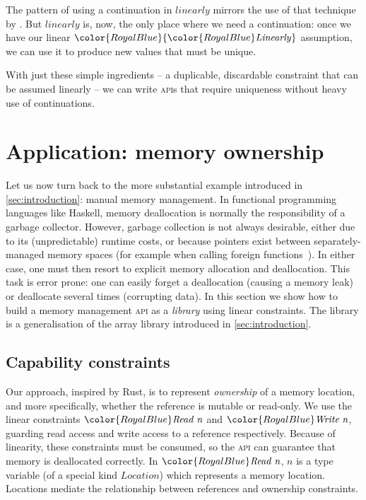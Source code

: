 \documentclass[acmsmall,usenames,dvipsnames,natbib=false,acmthm=false,screen]{acmart}
\newcommand{\Conid}[1]{\mathit{#1}}
\newcommand{\Varid}[1]{\mathit{#1}}
\newcommand{\constraintcolour}{\color{RoyalBlue}}
\newcommand{\constraintfont}[1]{{\constraintcolour#1}}
\theoremstyle{acmplain}
\theoremstyle{acmdefinition}
\begin{document}
The pattern of using a continuation in \ensuremath{\Varid{linearly}} mirrors the use
of that technique by \citet[Fig.~2]{LinearHaskell}. But
\ensuremath{\Varid{linearly}} is, now, the only place where we need a continuation: once
we have our linear \ensuremath{\constraintfont{\constraintfont{\Conid{Linearly}}}} assumption, we can use it to produce
new values that must be unique.

With just these simple ingredients -- a duplicable, discardable constraint
that can be assumed linearly -- we can write \textsc{api}s that require
uniqueness without heavy use of continuations.

\section{Application: memory ownership}
\label{sec:memory-ownership}
Let us now turn back to the more substantial example introduced in
\cref{sec:introduction}: manual memory management.  In functional programming
languages like Haskell, memory deallocation is normally the responsibility of a
garbage collector. However, garbage collection is
not always desirable, either due to its (unpredictable) runtime costs, or because
pointers exist between separately-managed memory spaces
(for example when calling foreign functions~\cite{linear-inline-java}).
In either case, one must then
resort to explicit memory allocation and deallocation. This task is
error prone: one can easily forget a deallocation (causing a memory
leak) or deallocate several times (corrupting data). In this section we show how
to build a %
memory management \textsc{api} as a \emph{library} using linear
constraints. The library is a generalisation of the array library
introduced in \cref{sec:introduction}.

\subsection{Capability constraints}
\label{sec:atomic-references}

Our approach, inspired by Rust, is
to represent \emph{ownership} of a memory location, and more specifically,
whether the reference is mutable or read-only.
We use the linear constraints \ensuremath{\constraintfont{\Conid{Read}\;\Varid{n}}} and \ensuremath{\constraintfont{\Conid{Write}\;\Varid{n}}},
guarding read access and write access to a reference respectively.
Because of linearity, these constraints
must be consumed, so the \textsc{api} can guarantee that memory
is deallocated correctly.
%
In \ensuremath{\constraintfont{\Conid{Read}\;\Varid{n}}}, \ensuremath{\Varid{n}} is a type variable (of a special kind \ensuremath{\Conid{Location}})
which represents a memory location. Locations mediate
the relationship between references and ownership constraints.
%
\end{document}

